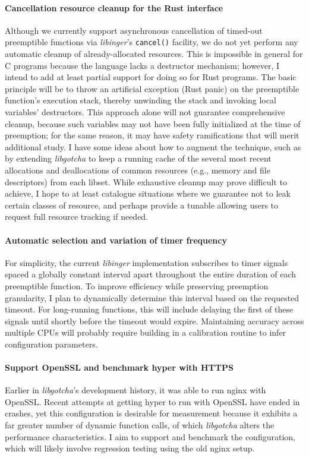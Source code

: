 \documentclass[12pt,letterpaper]{book}
\begin{document}
\paragraph{Cancellation resource cleanup for the Rust interface}
Although we currently support asynchronous cancellation of timed-out preemptible
functions via \textit{libinger}'s \texttt{cancel()} facility, we do not yet perform
any automatic cleanup of already-allocated resources.  This is impossible
in general for C programs because the language lacks a destructor mechanism; however,
I intend to add at least partial support for doing so for Rust programs.  The basic
principle will be to throw an artificial exception (Rust panic) on the preemptible
function's execution stack, thereby unwinding the stack and invoking local variables'
destructors.  This approach alone will not guarantee comprehensive cleanup, because
such variables may not have been fully initialized at the time of preemption; for the
same reason, it may have safety ramifications that will merit additional study.  I
have some ideas about how to augment the technique, such as by extending
\textit{libgotcha} to keep a running cache of the several most recent allocations and
deallocations of common resources (e.g., memory and file descriptors) from each
libset.  While exhaustive cleanup may prove difficult to achieve, I hope to at least
catalogue situations where we guarantee not to leak certain classes of resource, and
perhaps provide a tunable allowing users to request full resource tracking if needed.

\paragraph{Automatic selection and variation of timer frequency}
For simplicity, the current \textit{libinger} implementation subscribes to timer
signals spaced a globally constant interval apart throughout the entire duration of
each preemptible function.  To improve efficiency while preserving preemption
granularity, I plan to dynamically determine this interval based on the requested
timeout.  For long-running functions, this will include delaying the first of these
signals until shortly before the timeout would expire.  Maintaining accuracy across
multiple CPUs will probably require building in a calibration routine to infer
configuration parameters.

\paragraph{Support OpenSSL and benchmark hyper with HTTPS}
Earlier in \textit{libgotcha}'s development history, it was able to run nginx with
OpenSSL.  Recent attempts at getting hyper to run with OpenSSL have ended in crashes,
yet this configuration is desirable for measurement because it exhibits a far greater
number of dynamic function calls, of which \textit{libgotcha} alters the performance
characteristics.  I aim to support and benchmark the configuration, which will likely
involve regression testing using the old nginx setup.
\end{document}
